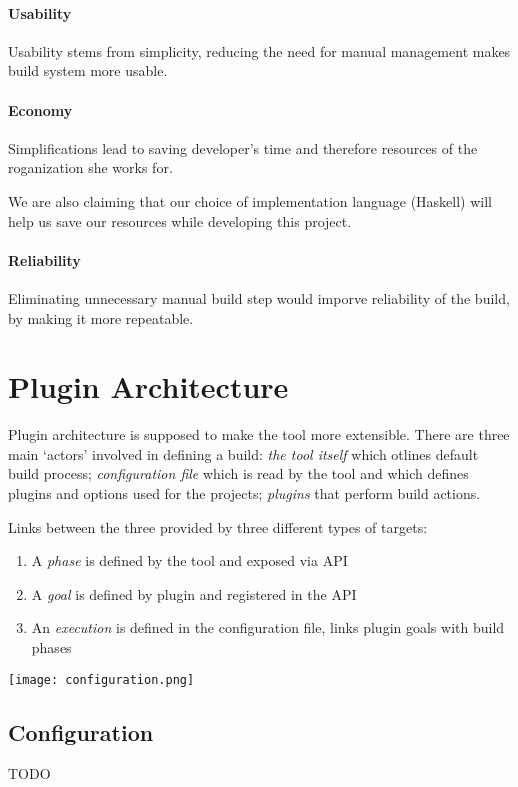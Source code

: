 \documentclass[11pt]{article}
\begin{document}
\paragraph{Usability}
Usability stems from simplicity, reducing the need for manual management makes build system more usable.

\paragraph{Economy}
Simplifications lead to saving developer's time and therefore resources of the
roganization she works for.

We are also claiming that our choice of implementation language (Haskell) will
help us save our resources while developing this project.

\paragraph{Reliability}
Eliminating unnecessary manual build step would imporve reliability of the
build, by making it more repeatable. 

\section{Plugin Architecture}
Plugin architecture is supposed to make the tool more extensible. There are
three main `actors' involved in defining a build: \textit{the tool itself}
which otlines default build process; \textit{configuration file} which is read
by the tool and which defines plugins and options used for the projects;
\textit{plugins} that perform build actions.

Links between the three provided by three different types of targets:
\begin{enumerate}
\item A \textit{phase} is defined by the tool and exposed via API
\item A \textit{goal} is defined by plugin and registered in the API
\item An \textit{execution} is defined in the configuration file, links plugin goals with build phases
\end{enumerate}

\texttt{[image: configuration.png]}

\subsection{Configuration}
TODO
\end{document}
